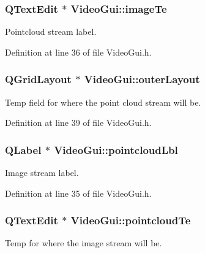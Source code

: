 \hypertarget{class_video_gui_a5e7d6fe6f8a140911e2f813296db579d}{
\subsubsection[{image\-Te}]{\setlength{\rightskip}{0pt plus 5cm}Q\-Text\-Edit $\ast$ Video\-Gui\-::image\-Te\hspace{0.3cm}{\ttfamily [private]}}}\label{class_video_gui_a5e7d6fe6f8a140911e2f813296db579d}
Pointcloud stream label. 

Definition at line 36 of file Video\-Gui.\-h.

\hypertarget{class_video_gui_a45d651b172a5cc6bde6e9bb0daa0dc2b}{
\subsubsection[{outer\-Layout}]{\setlength{\rightskip}{0pt plus 5cm}Q\-Grid\-Layout $\ast$ Video\-Gui\-::outer\-Layout\hspace{0.3cm}{\ttfamily [private]}}}\label{class_video_gui_a45d651b172a5cc6bde6e9bb0daa0dc2b}
Temp field for where the point cloud stream will be. 

Definition at line 39 of file Video\-Gui.\-h.

\hypertarget{class_video_gui_a0fe846d1253b84ce60aedfa435bbfdfc}{
\subsubsection[{pointcloud\-Lbl}]{\setlength{\rightskip}{0pt plus 5cm}Q\-Label $\ast$ Video\-Gui\-::pointcloud\-Lbl\hspace{0.3cm}{\ttfamily [private]}}}\label{class_video_gui_a0fe846d1253b84ce60aedfa435bbfdfc}
Image stream label. 

Definition at line 35 of file Video\-Gui.\-h.

\hypertarget{class_video_gui_a682f0bb767a19987413b987aaef49e88}{
\subsubsection[{pointcloud\-Te}]{\setlength{\rightskip}{0pt plus 5cm}Q\-Text\-Edit $\ast$ Video\-Gui\-::pointcloud\-Te\hspace{0.3cm}{\ttfamily [private]}}}\label{class_video_gui_a682f0bb767a19987413b987aaef49e88}
Temp for where the image stream will be. 

